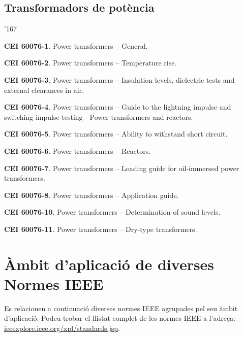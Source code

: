 \subsection*{Transformadors de pot\`{e}ncia}
\begin{dinglist}{'167}
    \item \textbf{CEI 60076-1}. Power transformers -- General.
    \item \textbf{CEI 60076-2}. Power transformers -- Temperature rise.
    \item \textbf{CEI 60076-3}. Power transformers -- Insulation levels, dielectric tests and external clearances in air.
    \item \textbf{CEI 60076-4}. Power transformers -- Guide to the lightning impulse and switching impulse testing - Power transformers and reactors.
    \item \textbf{CEI 60076-5}. Power transformers -- Ability to withstand short circuit.
    \item \textbf{CEI 60076-6}. Power transformers -- Reactors.
    \item \textbf{CEI 60076-7}. Power transformers -- Loading guide for oil-immersed power transformers.
    \item \textbf{CEI 60076-8}. Power transformers -- Application guide.
    \item \textbf{CEI 60076-10}. Power transformers -- Determination of sound levels.
    \item \textbf{CEI 60076-11}. Power transformers -- Dry-type transformers.
\end{dinglist}


\section{\`{A}mbit d'aplicaci\'{o} de diverses Normes IEEE}\label{sec:normes_IEEE}

Es relacionen a continuaci\'{o} diverses normes \textsf{IEEE} agrupades pel seu \`{a}mbit d'aplicaci\'{o}. Podeu trobar el llistat complet de les normes \textsf{IEEE} a l'adre\c{c}a: \href{http://ieeexplore.ieee.org/xpl/standards.jsp}{ieeexplore.ieee.org/xpl/standards.jsp}.

